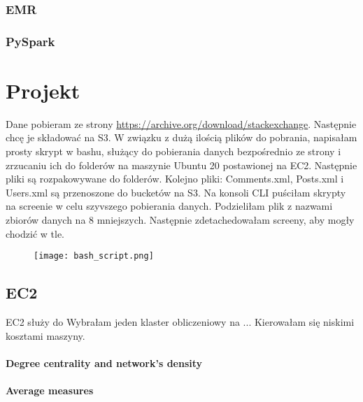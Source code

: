 \documentclass[a4paper,12pt,twoside]{report} %
\begin{document}
\subsection{EMR}

\subsection{PySpark}


\chapter{Projekt}
Dane pobieram ze strony \url{https://archive.org/download/stackexchange}. Następnie chcę je składować na S3. W związku z dużą ilością plików do pobrania, napisałam prosty skrypt w bashu, służący do pobierania danych bezpośrednio ze strony i zrzucaniu ich do folderów na maszynie Ubuntu 20 postawionej na EC2. Następnie pliki są rozpakowywane do folderów. Kolejno pliki: Comments.xml, Posts.xml i Users.xml są przenoszone do bucketów na S3.
Na konsoli CLI puściłam skrypty na screenie w celu szyvszego pobierania danych. Podzieliłam plik z nazwami zbiorów danych na 8 mniejszych. Następnie zdetachedowałam screeny, aby mogły chodzić w tle.

\begin{figure}[H]
\centering
\texttt{[image: bash\_script.png]}
\label{fig:bash_script}
\end{figure}


\section{EC2} 
EC2 służy do
Wybrałam jeden klaster obliczeniowy na ... Kierowałam się niskimi kosztami maszyny.


\subsubsection{Degree centrality and network's density}



\subsubsection{Average measures}
\end{document}
